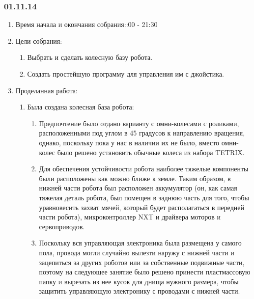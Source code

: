 
\subsubsection{01.11.14}

\begin{enumerate}
	\item Время начала и окончания собрания::00 - 21:30
	\item Цели собрания:\newline
	\begin{enumerate}
		\item Выбрать и сделать колесную базу робота.\newline
		
		\item Создать простейшую программу для управления им с джойстика.\newline
		
	\end{enumerate}
	
	\item Проделанная работа:\newline
	\begin{enumerate}
		\item Была создана колесная база робота:\newline
		\begin{enumerate}
			\item Предпочтение было отдано варианту с омни-колесами с роликами, расположенными под углом в 45 градусов к направлению вращения, однако, поскольку пока у нас в наличии их не было, вместо омни-колес было решено установить обычные колеса из набора TETRIX.\newline
			
			\item Для обеспечения устойчивости робота наиболее тяжелые компоненты были расположены как можно ближе к земле. Таким образом, в нижней части робота был расположен аккумулятор (он, как самая тяжелая деталь робота, был помещен в заднюю часть для того, чтобы уравновесить захват мячей, который будет располагаться в передней части робота), микроконтроллер NXT и драйвера моторов и сервоприводов.\newline
			
			\item Поскольку вся управляющая электроника была размещена у самого пола, провода могли случайно вылезти наружу с нижней части и зацепиться за других роботов или за собственные подвижные части, поэтому на следующее занятие было решено принести пластмассовую папку и вырезать из нее кусок для днища нужного размера, чтобы защитить управляющую электронику с проводами с нижней части.\newline
			

\end{enumerate}
\end{enumerate}
\end{enumerate}
